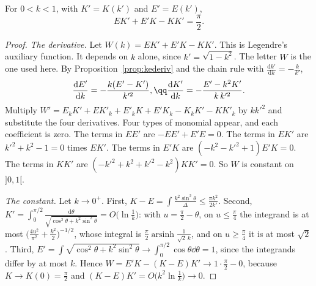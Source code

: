 \begin{theorem}\label{thm:legendre}
For $0<k<1$, with $K'=K(k')$ and $E'=E(k')$,
\[
EK'+E'K-KK'=\frac\pi2.
\]
\end{theorem}
\begin{proof}
\emph{The derivative.} Let $W(k)=EK'+E'K-KK'$. This is Legendre's auxiliary function. It depends on $k$ alone, since $k'=\sqrt{1-k^2}$. The letter $W$ is the one used here. By Proposition~\ref{prop:kederiv} and the chain rule with $\frac{\mathrm dk'}{\mathrm dk}=-\frac k{k'}$,
\[
\begin{gathered}\frac{\mathrm dE'}{\mathrm dk}=-\frac{k(E'-K')}{k'^2},\qq\frac{\mathrm dK'}{\mathrm dk}=-\frac{E'-k^2K'}{k\,k'^2}.\end{gathered}
\]
Multiply $W'=E_kK'+EK'_k+E'_kK+E'K_k-K_kK'-KK'_k$ by $kk'^2$ and substitute the four derivatives. Four types of monomial appear, and each coefficient is zero. The terms in $EE'$ are $-EE'+E'E=0$. The terms in $EK'$ are $k'^2+k^2-1=0$ times $EK'$. The terms in $E'K$ are $(-k^2-k'^2+1)E'K=0$. The terms in $KK'$ are $(-k'^2+k^2+k'^2-k^2)KK'=0$. So $W$ is constant on $]0,1[$.

\emph{The constant.} Let $k\to0^+$. First, $K-E=\int\frac{k^2\sin^2\theta}\Delta\le\frac{\pi k^2}{2k'}$. Second, $K'=\int_0^{\pi/2}\frac{\mathrm d\theta}{\sqrt{\cos^2\theta+k^2\sin^2\theta}}=O\bigl(\ln\frac1k\bigr)$:
with $u=\frac\pi2-\theta$, on $u\le\frac\pi4$ the integrand is at most $\bigl(\frac{4u^2}{\pi^2}+\frac{k^2}2\bigr)^{-1/2}$, whose integral is $\frac\pi2\operatorname{arsinh}\frac1{\sqrt2\,k}$, and on $u\ge\frac\pi4$
it is at most $\sqrt2$. Third, $E'=\int\sqrt{\cos^2\theta+k^2\sin^2\theta}\to\int_0^{\pi/2}\cos\theta\dd\theta=1$, since the integrands differ by at most $k$. Hence
$W=E'K-(K-E)K'\to1\cdot\frac\pi2-0$, because $K\to K(0)=\frac\pi2$ and $(K-E)K'=O\bigl(k^2\ln\frac1k\bigr)\to0$.
\end{proof}

